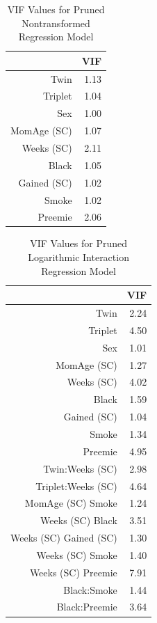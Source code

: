 \documentclass{article}\usepackage[]{graphicx}\usepackage[]{xcolor}
\begin{document}
\begin{table}[ht]
\centering
\begin{tabular}{rr}
  \hline
 & VIF \\ 
  \hline
Twin & 1.13 \\ 
  Triplet & 1.04 \\ 
  Sex & 1.00 \\ 
  MomAge (SC) & 1.07 \\ 
  Weeks (SC) & 2.11 \\ 
  Black & 1.05 \\ 
  Gained (SC) & 1.02 \\ 
  Smoke & 1.02 \\ 
  Preemie & 2.06 \\ 
   \hline
\end{tabular}
\caption{VIF Values for Pruned Nontransformed Regression Model} 
\label{vif.val.assu}
\end{table}

\begin{table}[ht]
\centering
\begin{tabular}{rr}
  \hline
 & VIF \\ 
  \hline
Twin & 2.24 \\ 
  Triplet & 4.50 \\ 
  Sex & 1.01 \\ 
  MomAge (SC) & 1.27 \\ 
  Weeks (SC) & 4.02 \\ 
  Black & 1.59 \\ 
  Gained (SC) & 1.04 \\ 
  Smoke & 1.34 \\ 
  Preemie & 4.95 \\ 
  Twin:Weeks (SC) & 2.98 \\ 
  Triplet:Weeks (SC) & 4.64 \\ 
  MomAge (SC) Smoke & 1.24 \\ 
  Weeks (SC) Black & 3.51 \\ 
  Weeks (SC) Gained (SC) & 1.30 \\ 
  Weeks (SC) Smoke & 1.40 \\ 
  Weeks (SC) Preemie & 7.91 \\ 
  Black:Smoke & 1.44 \\ 
  Black:Preemie & 3.64 \\ 
   \hline
\end{tabular}
\caption{VIF Values for Pruned Logarithmic Interaction Regression Model} 
\label{vif.val.accur}
\end{table}
\end{document}
